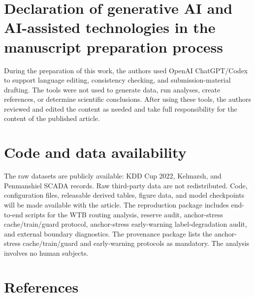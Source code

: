 \documentclass[
  11pt]{article}
\begin{document}
\section{Declaration of generative AI and AI-assisted technologies in
the manuscript preparation
process}\label{declaration-of-generative-ai-and-ai-assisted-technologies-in-the-manuscript-preparation-process}

During the preparation of this work, the authors used OpenAI
ChatGPT/Codex to support language editing, consistency checking, and
submission-material drafting. The tools were not used to generate data,
run analyses, create references, or determine scientific conclusions.
After using these tools, the authors reviewed and edited the content as
needed and take full responsibility for the content of the published
article.

\section{Code and data availability}\label{code-and-data-availability}

The raw datasets are publicly available: KDD Cup 2022, Kelmarsh, and
Penmanshiel SCADA records. Raw third-party data are not redistributed.
Code, configuration files, releasable derived tables, figure data, and
model checkpoints will be made available with the article. The
reproduction package includes end-to-end scripts for the WTB routing
analysis, reserve audit, anchor-stress cache/train/guard protocol,
anchor-stress early-warning label-degradation audit, and external
boundary diagnostics. The provenance package lists the anchor-stress
cache/train/guard and early-warning protocols as mandatory. The analysis
involves no human subjects.

\clearpage

\section*{References}\label{references}
\end{document}

